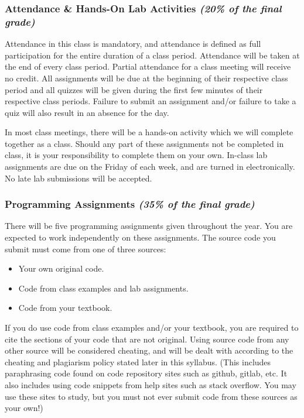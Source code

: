 \documentclass[11pt]{article}
\begin{document}
\subsubsection*{Attendance \& Hands-On Lab Activities {\em (20\% of the final grade)}}
Attendance in this class is
mandatory, and attendance is defined as full participation for the
entire duration of a class period. Attendance will be taken at the
end of every class period. Partial attendance for a class meeting
will receive no credit. All assignments will be due at the beginning of their 
respective class period and all
quizzes will be given during the first few minutes of their respective
class periods. Failure to submit an assignment and/or failure to take
a quiz will also result in an absence for the day.

In most class meetings, there will be a hands-on activity which we
will complete together as a class.  Should any part of these assignments
not be completed in class, it is your responsibility to complete them
on your own.  In-class lab assignments are due on the Friday of each
week, and are turned in electronically.  No late lab submissions will
be accepted.


\subsubsection*{Programming Assignments {\em (35\% of the final grade)}}
There will be five programming assignments given throughout the year.
You are expected to work independently on these assignments.  The
source code you submit must come from one of three sources:
\begin{itemize}
    \item Your own original code.
    \item Code from class examples and lab assignments.
    \item Code from your textbook.
\end{itemize}

If you do use code from class examples and/or your textbook, you are
required to cite the sections of your code that are not original.
Using source code from any other source will be considered cheating,
and will be dealt with according to the cheating and plagiarism policy
stated later in this syllabus.
(This includes paraphrasing code found on code repository sites such
as github, gitlab, etc.  It also includes using code snippets from
help sites such as stack overflow.  You may use these sites to study,
but you must not ever submit code from these sources as your own!)
\end{document}
